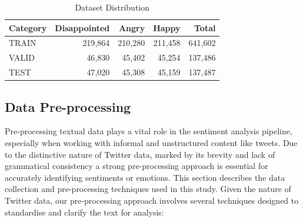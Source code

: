 \documentclass{article}
\begin{document}
\begin{table}[h]
  \caption{Dataset Distribution}
  \label{sample-table}
  \centering
  \begin{tabular}{lrrrr}
    \toprule
    Category & Disappointed & Angry & Happy & Total \\
    \midrule
    TRAIN    & 219{,}864    & 210{,}280 & 211{,}458 & 641{,}602 \\
    VALID    & 46{,}830     & 45{,}402  & 45{,}254  & 137{,}486 \\
    TEST     & 47{,}020     & 45{,}308  & 45{,}159  & 137{,}487 \\
    \bottomrule
  \end{tabular}
\end{table}


\subsection{Data Pre-processing}
Pre-processing textual data plays a vital role in the sentiment analysis pipeline, especially when working with informal and unstructured content like tweets. Due to the distinctive nature of Twitter data, marked by its brevity and lack of grammatical consistency a strong pre-processing approach is essential for accurately identifying sentiments or emotions. This section describes the data collection and pre-processing techniques used in this study. Given the nature of Twitter data, our pre-processing approach involves several techniques designed to standardise and clarify the text for analysis:
\end{document}
